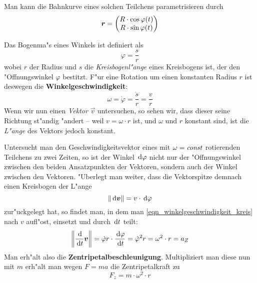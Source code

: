 Man kann die Bahnkurve eines solchen Teilchens parametrisieren durch
$$
 \boldsymbol{r} = \begin{pmatrix}
              R \cdot \cos \varphi(t)\\
              R \cdot \sin \varphi(t)
         \end{pmatrix}
$$

Das Bogenma"s eines Winkels ist definiert als
\begin{equation*}
   \varphi = \frac{s}{r}
\end{equation*}
wobei $r$ der Radius und $s$ die \emph{Kreisbogenl"ange} eines
Kreisbogens ist, der den "Offnungswinkel $\varphi$ bestitzt. F"ur eine
Rotation um einen konstanten Radius $r$ ist deswegen die
\textbf{Winkelgeschwindigkeit}:
\begin{equation}
   \label{eqn_winkelgeschwindigkeit_kreis}
   \omega = \dot \varphi = \frac{\dot s}{r} = \frac{v}{r}
\end{equation}
Wenn wir nun einen \emph{Vektor} $\vec v$ untersuchen, so sehen wir,
dass dieser seine Richtung st"andig "andert -- weil $v = \omega \cdot r$
ist, und $\omega$ und $r$ konstant sind, ist die \emph{L"ange} des
Vektors jedoch konstant. 

Untersucht man den Geschwindigkeitsvektor
eines mit $\omega = \text{\emph{const}}$ rotierenden Teilchens zu zwei Zeiten, so
ist der Winkel $\, \mathrm{d} \varphi$ nicht nur der "Offnungswinkel zwischen den
beiden Ansatzpunkten der Vektoren, sondern auch der Winkel zwischen
den Vektoren. "Uberlegt man weiter, dass die Vektorspitze demnach einen
Kreisbogen der L"ange
\begin{equation*}
   \| \, \mathrm{d} \boldsymbol{v} \| = v \cdot \, \mathrm{d} \varphi
\end{equation*}
zur"uckgelegt hat, so findet man, in dem man
\eqref{eqn_winkelgeschwindigkeit_kreis} nach $v$ aufl"ost, einsetzt und
durch $\, \mathrm{d} t$ teilt:
\begin{equation}
   \label{eqn_winkelbeschleunigung_kreis}
\left \|   \frac{\, \mathrm{d} }{\, \mathrm{d} t} \boldsymbol{v} \right \| =  \dot \varphi r
\cdot \frac{\, \mathrm{d} \varphi}{\, \mathrm{d} t} = {\dot \varphi}^2 r = \omega^2
\cdot r = a_Z
\end{equation}
Man erh"alt also die
\textbf{Zentripetalbeschleunigung}.
Multipliziert man diese nun mit $m$ erh"alt man wegen $F = ma$ die
Zentripetalkraft zu
\begin{equation}
   \label{eqn_zentripetalkraft_kreis}
   F_z = m \cdot \omega^2 \cdot r
\end{equation}



